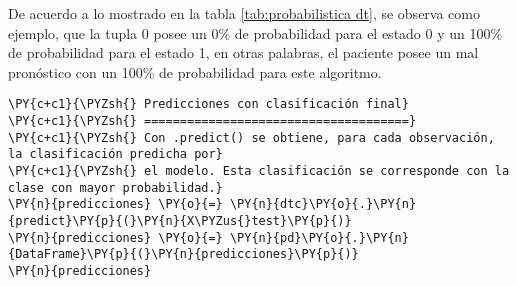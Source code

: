 \begin{table}[H]
\centering
\setlength{\tabcolsep}{10pt}
\caption{Predicciones probabilísticas para cada observación Decision Tree
}
\label{tab:probabilistica dt}
\end{table}
      
    De acuerdo a lo mostrado en la tabla \ref{tab:probabilistica dt}, se observa como ejemplo, que la tupla 0 posee un 0\% de probabilidad para el estado 0 y un 100\% de probabilidad para el estado 1, en otras palabras, el paciente posee un mal pronóstico con un 100\% de probabilidad para este algoritmo.

    \begin{tcolorbox}[breakable, size=fbox, boxrule=1pt, pad at break*=1mm,colback=cellbackground, colframe=cellborder]
\begin{Verbatim}[commandchars=\\\{\}]
\PY{c+c1}{\PYZsh{} Predicciones con clasificación final}
\PY{c+c1}{\PYZsh{} =====================================}
\PY{c+c1}{\PYZsh{} Con .predict() se obtiene, para cada observación, la clasificación predicha por}
\PY{c+c1}{\PYZsh{} el modelo. Esta clasificación se corresponde con la clase con mayor probabilidad.}
\PY{n}{predicciones} \PY{o}{=} \PY{n}{dtc}\PY{o}{.}\PY{n}{predict}\PY{p}{(}\PY{n}{X\PYZus{}test}\PY{p}{)}
\PY{n}{predicciones} \PY{o}{=} \PY{n}{pd}\PY{o}{.}\PY{n}{DataFrame}\PY{p}{(}\PY{n}{predicciones}\PY{p}{)}
\PY{n}{predicciones}
\end{Verbatim}
\end{tcolorbox}

